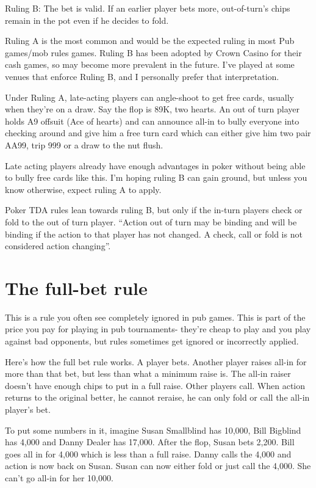 Ruling B: The bet is valid. If an earlier player bets more, out-of-turn's chips
remain in the pot even if he decides to fold. 

Ruling A is the most common and would be the expected ruling in most
Pub games/mob rules games. Ruling B has been adopted
by Crown Casino for their cash games, so may become more prevalent
in the future. I've played at some venues that enforce Ruling B, and
I personally prefer that interpretation.

Under Ruling A, late-acting players can angle-shoot to get free
cards, usually when they're on a draw. Say the flop is 89K, two hearts.
An out of turn player holds A9 offsuit (Ace of hearts) and can announce
all-in to bully everyone into checking around and give him a free
turn card which can either give him two pair AA99, trip 999 or a draw
to the nut flush.

Late acting players already have enough advantages in poker without 
being able to bully free cards like this. I'm hoping ruling B can 
gain ground, but unless you know otherwise, expect ruling A to apply.

Poker TDA rules lean towards ruling B, but only if the in-turn players
check or fold to the out of turn player. ``Action out of turn may be binding
and will be binding if the action to that player has not changed. A
check, call or fold is not considered action changing''.


\section{The full-bet rule}

This is a rule you often see completely ignored in pub games. 
This is part of the price you pay for playing
in pub tournaments- they're cheap to play and you play against
bad opponents, but rules sometimes get ignored or incorrectly applied.

Here's how the full bet rule works. A player bets. Another player 
raises all-in for more than that bet, but less than what a minimum raise is. 
The all-in raiser doesn't have enough chips to put in a full raise. 
Other players call. When action returns to the original better, he 
cannot reraise, he can only fold or call the all-in player's bet.

To put some numbers in it, imagine Susan Smallblind has 10,000,
Bill Bigblind has 4,000 and Danny Dealer has 17,000. After the flop, 
Susan bets 2,200. Bill goes all in for 4,000 which is less
than a full raise. Danny calls the 4,000 and action is now back on Susan.
Susan can now either fold or just call the 4,000. She can't go all-in 
for her 10,000.

